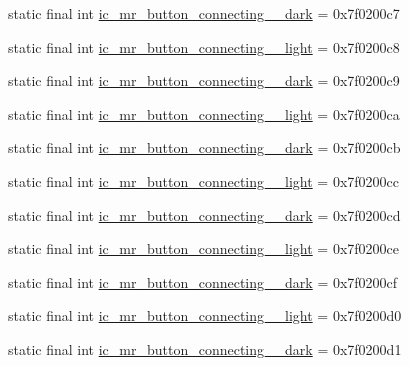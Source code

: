 \begin{CompactItemize}
\item 
static final int \hyperlink{classandroid_1_1support_1_1graphics_1_1drawable_1_1_r_1_1drawable_1aad16a35d00f17308efa8205342c867}{ic\_\-mr\_\-button\_\-connecting\_\_\-dark} = 0x7f0200c7
\item 
static final int \hyperlink{classandroid_1_1support_1_1graphics_1_1drawable_1_1_r_1_1drawable_ad937df56cd8dc5a32ae34a6574cedb4}{ic\_\-mr\_\-button\_\-connecting\_\_\-light} = 0x7f0200c8
\item 
static final int \hyperlink{classandroid_1_1support_1_1graphics_1_1drawable_1_1_r_1_1drawable_46090246eaa2fc2ddf2358dff6c4102e}{ic\_\-mr\_\-button\_\-connecting\_\_\-dark} = 0x7f0200c9
\item 
static final int \hyperlink{classandroid_1_1support_1_1graphics_1_1drawable_1_1_r_1_1drawable_f14cbf42695ce739fa9782ac6d8ce406}{ic\_\-mr\_\-button\_\-connecting\_\_\-light} = 0x7f0200ca
\item 
static final int \hyperlink{classandroid_1_1support_1_1graphics_1_1drawable_1_1_r_1_1drawable_039363c9c006fd5d35f43a1ba4587177}{ic\_\-mr\_\-button\_\-connecting\_\_\-dark} = 0x7f0200cb
\item 
static final int \hyperlink{classandroid_1_1support_1_1graphics_1_1drawable_1_1_r_1_1drawable_85e18e136468061cd29c228c6a9b72f8}{ic\_\-mr\_\-button\_\-connecting\_\_\-light} = 0x7f0200cc
\item 
static final int \hyperlink{classandroid_1_1support_1_1graphics_1_1drawable_1_1_r_1_1drawable_83718b20ce52c73cbcf8437f57bf0118}{ic\_\-mr\_\-button\_\-connecting\_\_\-dark} = 0x7f0200cd
\item 
static final int \hyperlink{classandroid_1_1support_1_1graphics_1_1drawable_1_1_r_1_1drawable_eada339d04625570d48d7c215a299e5c}{ic\_\-mr\_\-button\_\-connecting\_\_\-light} = 0x7f0200ce
\item 
static final int \hyperlink{classandroid_1_1support_1_1graphics_1_1drawable_1_1_r_1_1drawable_4adb5dff340dcfb619d89135b2a47d0d}{ic\_\-mr\_\-button\_\-connecting\_\_\-dark} = 0x7f0200cf
\item 
static final int \hyperlink{classandroid_1_1support_1_1graphics_1_1drawable_1_1_r_1_1drawable_48ea675c299555d74f9b5dd18bd6f61a}{ic\_\-mr\_\-button\_\-connecting\_\_\-light} = 0x7f0200d0
\item 
static final int \hyperlink{classandroid_1_1support_1_1graphics_1_1drawable_1_1_r_1_1drawable_15852f0cd651998c9cf05a886bd26d75}{ic\_\-mr\_\-button\_\-connecting\_\_\-dark} = 0x7f0200d1

\end{CompactItemize}
